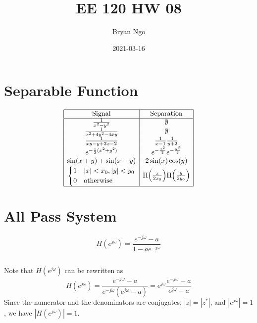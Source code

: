 \documentclass{article}
\title{EE 120 HW 08}
\author{Bryan Ngo}
\date{2021-03-16}
\begin{document}
\maketitle

\section{Separable Function}

\begin{equation}
    \begin{array}{|c|c|}
        \hline
        \text{Signal} & \text{Separation} \\
        \hline
        \frac{1}{x^2 - y^2} & \emptyset \\
        \frac{1}{x^2 + 4y^2 - 4xy} & \emptyset \\
        \frac{1}{xy - y + 2x - 2} & \frac{1}{x - 1} \frac{1}{y + 2} \\
        e^{-\frac{1}{2} (x^2 + y^2)} & e^{-\frac{x^2}{2}} e^{-\frac{y^2}{2}} \\
        \sin(x + y) + \sin(x - y) & 2 \sin(x) \cos(y) \\
        \begin{cases}
            1 & |x| < x_0, |y| < y_0 \\
            0 & \text{otherwise}
        \end{cases} & \Pi\qty(\frac{x}{2x_0}) \Pi\qty(\frac{y}{2y_0}) \\
        \hline
    \end{array}
\end{equation}

\section{All Pass System}

\begin{equation}
    H(e^{j \omega}) = \frac{e^{-j \omega} - a}{1 - ae^{-j \omega}}
\end{equation}

\subsection{}

Note that \(H(e^{j \omega})\) can be rewritten as
\begin{equation}
    H(e^{j \omega}) = \frac{e^{-j \omega} - a}{e^{-j \omega} (e^{j \omega} - a)} = e^{j \omega} \frac{e^{-j \omega} - a}{e^{j \omega} - a}
\end{equation}
Since the numerator and the denominators are conjugates, \(|z| = |z^\ast|\), and \(|e^{j \omega}| = 1\), we have \(|H(e^{j \omega})| = 1\).
\end{document}
